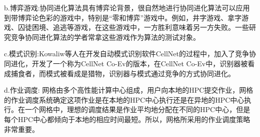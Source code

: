 \documentclass[8pt]{article}
\begin{document}
\begin{description}
        \item b.博弈游戏:协同进化算法具有博弈论背景，很自然地进行协同进化算法可以应用到带博弈论色彩的游戏中，特别是“零和博弈”游戏中。例如，井字游戏、拿字游戏、囚徒困境、追逃等游戏，在这些游戏中，一方胜利意味着另一方失败。一些研究竞争协同进化算法的学者常拿这些游戏作为算法的测试对象。              
        \item c.模式识别:Kowaliw等人在开发自动模式识别软件CellNet的过程中，加入了竞争协同进化，开发了一个称为CellNet Co-Ev的版本，在CellNet Co-Ev中，识别器被看成捕食者，而模式被看成是猎物，识别器与模式通过竞争的方式协同进化。        
        \item d.作业调度: 网格由多个高性能计算中心组成，用户向本地的HPC提交作业，网格的作业调度系统确定这项作业是在本地的HPC中心执行还是在异地的HPC中心执行。在一个网格中，理想的调度结果是作业平均地分配在不同的HPC中心，但是每个HPC中心都倾向于本地的相应时间最短。所以，网格所采用的作业调度策略非常重要。        
	\end{description}
\end{document}
